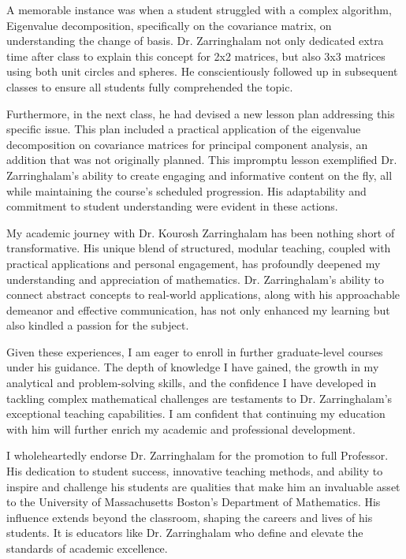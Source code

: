 \documentclass[11pt,a4paper,roman]{moderncv}
\begin{document}
\vspace{0.5cm}
A memorable instance was when a student struggled with a complex algorithm, Eigenvalue decomposition, specifically on the covariance matrix, on understanding the change of basis. Dr. Zarringhalam not only dedicated extra time after class to explain this concept for 2x2 matrices, but also 3x3 matrices using both unit circles and spheres. He conscientiously followed up in subsequent classes to ensure all students fully comprehended the topic.

\vspace{0.5cm}
Furthermore, in the next class, he had devised a new lesson plan addressing this specific issue. This plan included a practical application of the eigenvalue decomposition on covariance matrices for principal component analysis, an addition that was not originally planned. This impromptu lesson exemplified Dr. Zarringhalam's ability to create engaging and informative content on the fly, all while maintaining the course's scheduled progression. His adaptability and commitment to student understanding were evident in these actions.

\vspace{0.5cm}
My academic journey with Dr. Kourosh Zarringhalam has been nothing short of transformative. His unique blend of structured, modular teaching, coupled with practical applications and personal engagement, has profoundly deepened my understanding and appreciation of mathematics. Dr. Zarringhalam's ability to connect abstract concepts to real-world applications, along with his approachable demeanor and effective communication, has not only enhanced my learning but also kindled a passion for the subject.

\vspace{0.5cm}
Given these experiences, I am eager to enroll in further graduate-level courses under his guidance. The depth of knowledge I have gained, the growth in my analytical and problem-solving skills, and the confidence I have developed in tackling complex mathematical challenges are testaments to Dr. Zarringhalam's exceptional teaching capabilities. I am confident that continuing my education with him will further enrich my academic and professional development.

\vspace{0.5cm}
I wholeheartedly endorse Dr. Zarringhalam for the promotion to full Professor. His dedication to student success, innovative teaching methods, and ability to inspire and challenge his students are qualities that make him an invaluable asset to the University of Massachusetts Boston's Department of Mathematics. His influence extends beyond the classroom, shaping the careers and lives of his students. It is educators like Dr. Zarringhalam who define and elevate the standards of academic excellence.
\vspace{0.5cm}

\makeletterclosing
\end{document}
